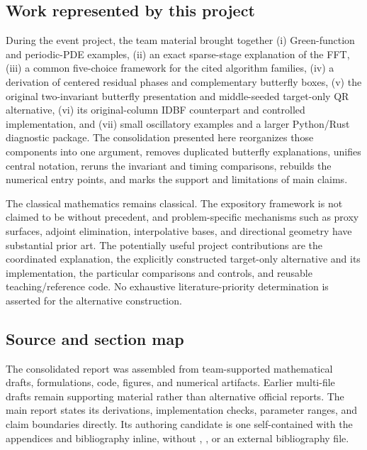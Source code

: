 \documentclass[11pt,a4paper]{article}
\begin{document}
\subsection{Work represented by this project}
During the event project, the team material brought together (i) Green-function and periodic-PDE examples, (ii) an exact sparse-stage explanation of the FFT, (iii) a common five-choice framework for the cited algorithm families, (iv) a derivation of centered residual phases and complementary butterfly boxes, (v) the original two-invariant butterfly presentation and middle-seeded target-only QR alternative, (vi) its original-column IDBF counterpart and controlled implementation, and (vii) small oscillatory examples and a larger Python/Rust diagnostic package. The consolidation presented here reorganizes those components into one argument, removes duplicated butterfly explanations, unifies central notation, reruns the invariant and timing comparisons, rebuilds the numerical entry points, and marks the support and limitations of main claims.

The classical mathematics remains classical. The expository framework is not claimed to be without precedent, and problem-specific mechanisms such as proxy surfaces, adjoint elimination, interpolative bases, and directional geometry have substantial prior art. The potentially useful project contributions are the coordinated explanation, the explicitly constructed target-only alternative and its implementation, the particular comparisons and controls, and reusable teaching/reference code. No exhaustive literature-priority determination is asserted for the alternative construction.

\subsection{Source and section map}
The consolidated report was assembled from team-supported mathematical drafts, formulations, code, figures, and numerical artifacts. Earlier multi-file drafts remain supporting material rather than alternative official reports. The main report states its derivations, implementation checks, parameter ranges, and claim boundaries directly. Its authoring candidate is one self-contained  with the appendices and bibliography inline, without \verb||, \verb||, or an external bibliography file.
\end{document}
